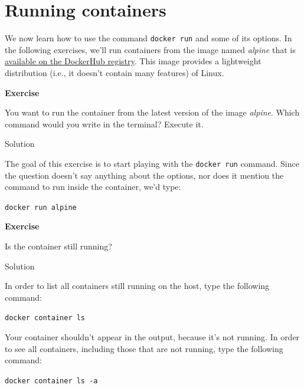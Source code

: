 \documentclass[
]{article}
\newenvironment{infobox}[1]
  {
  \begin{itemize}
  \renewcommand{\labelitemi}{
    \raisebox{-.7\height}[0pt][0pt]{
      
    }
  }
  \setlength{\fboxsep}{1em}
  \begin{whitebox}
  \item
  }
  {
  \end{whitebox}
  \end{itemize}
  }
\theoremstyle{definition}
\theoremstyle{definition}
\theoremstyle{definition}
\theoremstyle{remark}
\let\BeginKnitrBlock\begin \let\EndKnitrBlock\end
\begin{document}
\section{Running containers}\label{running}

We now learn how to use the command \texttt{docker\ run} and some of
its options.
In the following exercises, we'll run containers from the image named
\emph{alpine} that is
\href{https://hub.docker.com/_/alpine}{available on the DockerHub registry}.
This image provides a lightweight distribution
(i.e., it doesn't contain many features) of Linux.

\begin{infobox}{exercisebox}

\textbf{Exercise}

\BeginKnitrBlock{exercise}
\label{exr:unnamed-chunk-3}{\label{exr:unnamed-chunk-3} }You want to run the container from the latest version of
the image \emph{alpine}.
Which command would you write in the terminal?
Execute it.
\EndKnitrBlock{exercise}

\end{infobox}

Solution

\begin{infobox}{exercisebox}
The goal of this exercise is to start playing with the
\texttt{docker\ run} command.
Since the question doesn't say anything about the
options, nor does it mention the command to run inside the container,
we'd type:

\texttt{docker\ run\ alpine}

\end{infobox}

\begin{infobox}{exercisebox}

\textbf{Exercise}

\BeginKnitrBlock{exercise}
\label{exr:unnamed-chunk-5}{\label{exr:unnamed-chunk-5} }Is the container still running?
\EndKnitrBlock{exercise}

\end{infobox}

Solution

\begin{infobox}{exercisebox}
In order to list all containers still running on the host, type the
following command:

\texttt{docker\ container\ ls}

Your container shouldn't appear in the output,
because it's not running.
In order to see all containers, including those that are not
running, type the following command:

\texttt{docker\ container\ ls\ -a}

\end{infobox}
\end{document}
